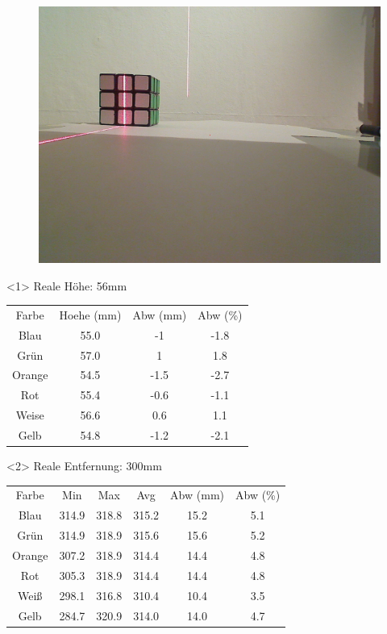 \documentclass[xcolor=dvipsnames]{beamer}
\begin{document}
\begin{frame}
\begin{figure}
\begin{minipage}{0.32\linewidth}
		\end{minipage}
		\hfill
		\begin{minipage}{0.32\linewidth}
			\includegraphics[width=\linewidth]{includes/test_color_3}
		\end{minipage}
	\end{figure}

	\begin{onlyenv}
		Reale Höhe: 56mm
		\begin{tabular}{c|c|c|c}
			Farbe & Hoehe (mm) & Abw (mm) & Abw (\%) \\
			Blau & 55.0 & -1 & -1.8\\
			Grün & 57.0 & 1 & 1.8\\
			Orange & 54.5 & -1.5 & -2.7\\
			Rot & 55.4 & -0.6 & -1.1\\
			Weise & 56.6 & 0.6 & 1.1\\
			Gelb & 54.8 & -1.2 & -2.1	
		\end{tabular}
	\end{onlyenv}
	\begin{onlyenv}
		Reale Entfernung: 300mm 
		\begin{tabular}{c|c|c|c|c|c}
			Farbe & Min & Max & Avg & Abw (mm) & Abw (\%)\\
			Blau & 314.9 & 318.8 & 315.2 & 15.2 & 5.1\\
			Grün & 314.9 & 318.9 & 315.6 & 15.6 & 5.2\\
			Orange & 307.2 & 318.9 & 314.4 & 14.4 & 4.8\\
			Rot & 305.3 & 318.9 & 314.4 & 14.4 & 4.8\\
			Weiß & 298.1 & 316.8 & 310.4 & 10.4 & 3.5\\
			Gelb & 284.7 & 320.9 & 314.0 & 14.0 & 4.7
		\end{tabular}
	\end{onlyenv}

\end{frame}
\end{document}
